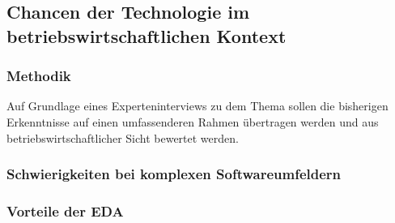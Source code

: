 \subsection{Chancen der Technologie im betriebswirtschaftlichen Kontext}
\subsubsection*{Methodik}
Auf Grundlage eines Experteninterviews zu dem Thema sollen die bisherigen Erkenntnisse auf einen umfassenderen Rahmen übertragen werden und aus betriebswirtschaftlicher Sicht bewertet werden. 
\subsubsection*{Schwierigkeiten bei komplexen Softwareumfeldern}
\subsubsection*{Vorteile der EDA}
